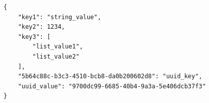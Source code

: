 \documentclass[11pt,a4paper]{article}
\begin{document}
\begin{verbatim}
{
    "key1": "string_value",
    "key2": 1234,
    "key3": [
        "list_value1",
        "list_value2"
    ],
    "5b64c88c-b3c3-4510-bcb8-da0b200602d8": "uuid_key",
    "uuid_value": "9700dc99-6685-40b4-9a3a-5e406dcb37f3"
}
\end{verbatim}
\end{document}
